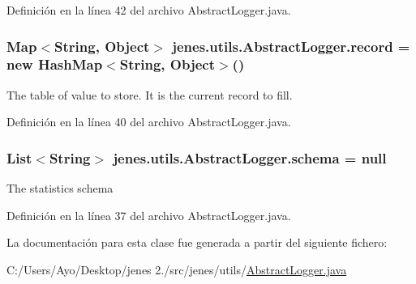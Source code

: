 Definición en la línea 42 del archivo Abstract\-Logger.\-java.

\hypertarget{classjenes_1_1utils_1_1_abstract_logger_ae85e356ad12255a9c5ec8f9f25659ef7}{
\subsubsection[{record}]{\setlength{\rightskip}{0pt plus 5cm}Map$<$String, Object$>$ jenes.\-utils.\-Abstract\-Logger.\-record = new Hash\-Map$<$String, Object$>$()\hspace{0.3cm}{\ttfamily [protected]}}}\label{classjenes_1_1utils_1_1_abstract_logger_ae85e356ad12255a9c5ec8f9f25659ef7}
The table of value to store. It is the current record to fill. 

Definición en la línea 40 del archivo Abstract\-Logger.\-java.

\hypertarget{classjenes_1_1utils_1_1_abstract_logger_a3a2030876857a0512fae7e0ad400c570}{
\subsubsection[{schema}]{\setlength{\rightskip}{0pt plus 5cm}List$<$String$>$ jenes.\-utils.\-Abstract\-Logger.\-schema = null\hspace{0.3cm}{\ttfamily [protected]}}}\label{classjenes_1_1utils_1_1_abstract_logger_a3a2030876857a0512fae7e0ad400c570}
The statistics schema 

Definición en la línea 37 del archivo Abstract\-Logger.\-java.



La documentación para esta clase fue generada a partir del siguiente fichero\-:\begin{DoxyCompactItemize}
\item 
C\-:/\-Users/\-Ayo/\-Desktop/jenes 2./src/jenes/utils/\hyperlink{_abstract_logger_8java}{Abstract\-Logger.\-java}\end{DoxyCompactItemize}
